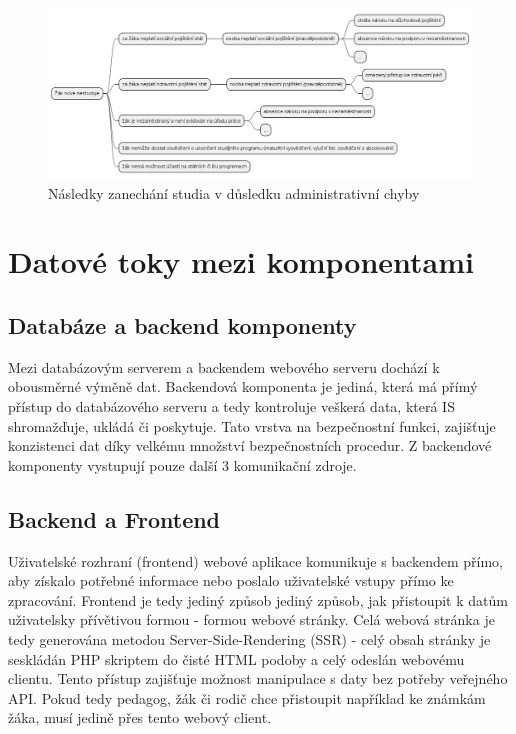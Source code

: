 \documentclass[FM,Proj]{tulthesis}
\begin{document}
\begin{figure}[H]
    \centering
    \includegraphics[width=\textheight-28pt, angle=90]{dusledky-nestudia.png}
    \caption{Následky zanechání studia v důsledku administrativní chyby}
    \label{fig:dusledky-nestudia}
\end{figure}

\section{Datové toky mezi komponentami}
\subsection*{Databáze a backend komponenty}
Mezi databázovým serverem a backendem webového serveru dochází k obousměrné výměně
dat. Backendová komponenta je jediná, která má přímý přístup do databázového serveru
a tedy kontroluje veškerá data, která IS shromažďuje, ukládá či poskytuje. Tato
vrstva na bezpečnostní funkci, zajišťuje konzistenci dat díky velkému množství
bezpečnostních procedur. Z backendové komponenty vystupují pouze další 3 komunikační
zdroje.

\subsection*{Backend a Frontend}
Uživatelské rozhraní (frontend) webové aplikace komunikuje s backendem přímo, aby získalo
potřebné informace nebo poslalo uživatelské vstupy přímo ke zpracování. Frontend je
tedy jediný způsob jediný způsob, jak přistoupit k datům uživatelsky přívětivou 
formou - formou webové stránky. Celá webová stránka je tedy generována metodou 
Server-Side-Rendering (SSR) - celý obsah stránky je seskládán
PHP skriptem do čisté HTML podoby a celý odeslán webovému clientu. Tento přístup zajišťuje
možnost manipulace s daty bez potřeby veřejného API. Pokud tedy pedagog, žák či 
rodič chce přistoupit například ke známkám žáka, musí jedině přes tento webový client.
\end{document}
